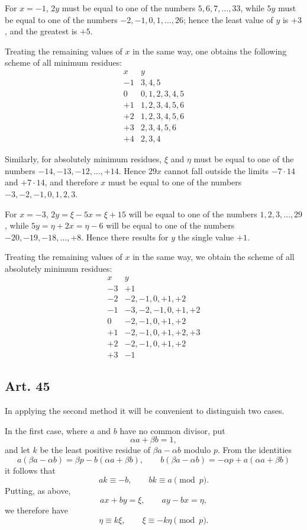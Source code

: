 \documentclass[12pt]{article}
\newcommand{\art}[1]{\subsection*{Art. #1}}
\begin{document}
For $x=-1$, $2y$ must be equal to one of the numbers $5,6,7,\ldots,33$, while $5y$ must be equal to one of the numbers $-2,-1,0,1,\ldots,26$; hence the least value of $y$ is $+3$, and the greatest is $+5$.

Treating the remaining values of $x$ in the same way, one obtains the following scheme of all minimum residues:
\[
\begin{array}{r|l}
x&y\\ \hline
-1&3,4,5\\
0&0,1,2,3,4,5\\
+1&1,2,3,4,5,6\\
+2&1,2,3,4,5,6\\
+3&2,3,4,5,6\\
+4&2,3,4
\end{array}
\]

Similarly, for absolutely minimum residues, $\xi$ and $\eta$ must be equal to one of the numbers $-14,-13,-12,\ldots,+14$. Hence $29x$ cannot fall outside the limits $-7\cdot14$ and $+7\cdot14$, and therefore $x$ must be equal to one of the numbers $-3,-2,-1,0,1,2,3$.

For $x=-3$, $2y=\xi-5x=\xi+15$ will be equal to one of the numbers $1,2,3,\ldots,29$, while $5y=\eta+2x=\eta-6$ will be equal to one of the numbers $-20,-19,-18,\ldots,+8$. Hence there results for $y$ the single value $+1$.

Treating the remaining values of $x$ in the same way, we obtain the scheme of all absolutely minimum residues:
\[
\begin{array}{r|l}
x&y\\ \hline
-3&+1\\
-2&-2,-1,0,+1,+2\\
-1&-3,-2,-1,0,+1,+2\\
0&-2,-1,0,+1,+2\\
+1&-2,-1,0,+1,+2,+3\\
+2&-2,-1,0,+1,+2\\
+3&-1
\end{array}
\]

\art{45}
In applying the second method it will be convenient to distinguish two cases.

In the first case, where $a$ and $b$ have no common divisor, put
\[
\alpha a+\beta b=1,
\]
and let $k$ be the least positive residue of $\beta a-\alpha b$ modulo $p$. From the identities
\[
a(\beta a-\alpha b)=\beta p-b(\alpha a+\beta b),\qquad
b(\beta a-\alpha b)=-\alpha p+a(\alpha a+\beta b)
\]
it follows that
\[
ak\equiv -b,\qquad bk\equiv a\pmod p.
\]
Putting, as above,
\[
ax+by=\xi,\qquad ay-bx=\eta,
\]
we therefore have
\[
\eta\equiv k\xi,\qquad \xi\equiv -k\eta\pmod p.
\]
\end{document}
